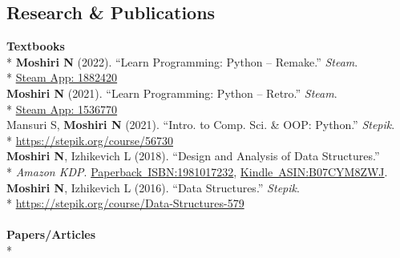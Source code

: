 \documentclass[margin,line]{res}
\begin{document}
\begin{resume}
\section{\sc Research \& Publications}
\textbf{Textbooks}\vspace{2mm}\\*
\hspace*{4mm} \textbf{Moshiri N} (2022). ``Learn Programming: Python -- Remake.'' \textit{Steam}.\\*\vspace{2mm}
\hspace*{8mm} \href{https://store.steampowered.com/app/1882420}{Steam App: 1882420}\\
\hspace*{4mm} \textbf{Moshiri N} (2021). ``Learn Programming: Python -- Retro.'' \textit{Steam}.\\*\vspace{2mm}
\hspace*{8mm} \href{https://store.steampowered.com/app/1536770}{Steam App: 1536770}\\
\hspace*{4mm} Mansuri S, \textbf{Moshiri N} (2021). ``Intro. to Comp. Sci. \& OOP: Python.'' \textit{Stepik}.\\*\vspace{2mm}
\hspace*{8mm} \href{https://stepik.org/course/56730}{https://stepik.org/course/56730}\\
\hspace*{4mm} \textbf{Moshiri N}, Izhikevich L (2018). ``Design and Analysis of Data Structures.''\\*\vspace{2mm}
\hspace*{8mm} \textit{Amazon KDP}. \href{https://www.amazon.com/dp/1981017232}{Paperback~ISBN:1981017232}, \href{https://www.amazon.com/dp/B07CYM8ZWJ}{Kindle~ASIN:B07CYM8ZWJ}.\\
\hspace*{4mm} \textbf{Moshiri N}, Izhikevich L (2016). ``Data Structures.'' \textit{Stepik}.\\*\vspace{2mm}
\hspace*{8mm} \href{https://stepik.org/course/Data-Structures-579}{https://stepik.org/course/Data-Structures-579}\\
~\\
\textbf{Papers/Articles}\vspace{2mm}\\*

\end{resume}
\end{document}
